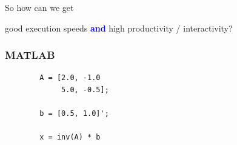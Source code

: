 \documentclass[
    xcolor={svgnames,dvipsnames},
    hyperref={colorlinks, citecolor=DeepPink4, linkcolor=DarkRed, urlcolor=DarkBlue}
    ]{beamer}  %
\newcommand{\navy}[1]{\textcolor{Blue}{\bf #1}}
\newcommand{\1}{\mathbbm 1}
\begin{document}
\begin{frame}
    
    So how can we get 

    \begin{center}
    good execution speeds \navy{and} high productivity / interactivity?
    \end{center}

\end{frame}



\begin{frame}[fragile]
    \frametitle{MATLAB}

    \begin{verbatim}
        A = [2.0, -1.0
             5.0, -0.5];

        b = [0.5, 1.0]';

        x = inv(A) * b
    \end{verbatim}


\end{frame}



\begin{frame}
    
    \begin{figure}
       \begin{center} %
       \end{center}
    \end{figure}

    
\end{frame}
\end{document}
